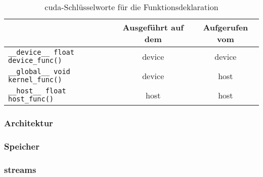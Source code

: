 \begin{table}
    \centering
    \begin{tabular}{| l | c | c |}
        \hline
        & Ausgeführt auf dem & Aufgerufen vom \\
        \hline
        \texttt{\_\_device\_\_ float device\_func()} & \gls{device} & \gls{device} \\
        \hline
        \texttt{\_\_global\_\_ void kernel\_func()} & \gls{device} & \gls{host} \\
        \hline
        \texttt{\_\_host\_\_ float host\_func()} & \gls{host} & \gls{host} \\
        \hline
    \end{tabular}
    \caption{\gls{cuda}-Schlüsselworte für die Funktionsdeklaration}
    \label{table:cu_func_keywords}
\end{table}

\subsubsection{Architektur}\label{sssec:cu_arch}

\subsubsection{Speicher}\label{sssec:cu_mem}

\subsubsection{\glspl{stream}}\label{sssec:cu_streams}
